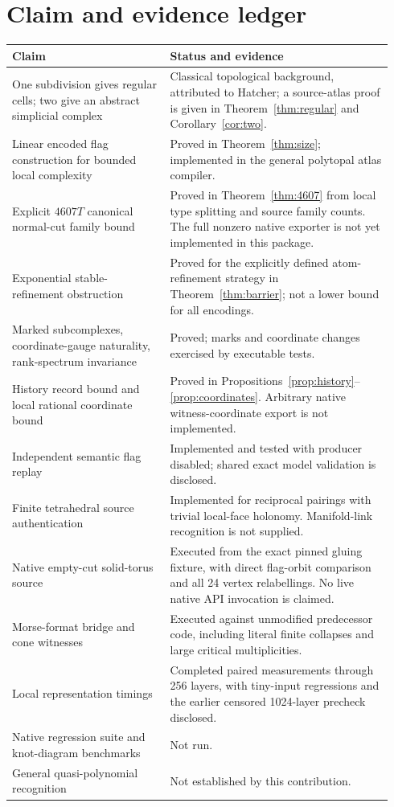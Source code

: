 \documentclass[11pt]{article}
\theoremstyle{definition}\newtheorem{definition}[theorem]{Definition}
\theoremstyle{remark}\newtheorem{remark}[theorem]{Remark}
\begin{document}
\section{Claim and evidence ledger}
\footnotesize
\begin{longtable}{p{0.39\linewidth}p{0.55\linewidth}}\toprule
Claim & Status and evidence\\\midrule\endhead
One subdivision gives regular cells; two give an abstract simplicial complex & Classical topological background, attributed to Hatcher; a source-atlas proof is given in Theorem~\ref{thm:regular} and Corollary~\ref{cor:two}.\\
Linear encoded flag construction for bounded local complexity & Proved in Theorem~\ref{thm:size}; implemented in the general polytopal atlas compiler.\\
Explicit \(4607T\) canonical normal-cut family bound & Proved in Theorem~\ref{thm:4607} from local type splitting and source family counts. The full nonzero native exporter is not yet implemented in this package.\\
Exponential stable-refinement obstruction & Proved for the explicitly defined atom-refinement strategy in Theorem~\ref{thm:barrier}; not a lower bound for all encodings.\\
Marked subcomplexes, coordinate-gauge naturality, rank-spectrum invariance & Proved; marks and coordinate changes exercised by executable tests.\\
History record bound and local rational coordinate bound & Proved in Propositions~\ref{prop:history}--\ref{prop:coordinates}. Arbitrary native witness-coordinate export is not implemented.\\
Independent semantic flag replay & Implemented and tested with producer disabled; shared exact model validation is disclosed.\\
Finite tetrahedral source authentication & Implemented for reciprocal pairings with trivial local-face holonomy. Manifold-link recognition is not supplied.\\
Native empty-cut solid-torus source & Executed from the exact pinned gluing fixture, with direct flag-orbit comparison and all 24 vertex relabellings. No live native API invocation is claimed.\\
Morse-format bridge and cone witnesses & Executed against unmodified predecessor code, including literal finite collapses and large critical multiplicities.\\
Local representation timings & Completed paired measurements through 256 layers, with tiny-input regressions and the earlier censored 1024-layer precheck disclosed.\\
Native regression suite and knot-diagram benchmarks & Not run.\\
General quasi-polynomial recognition & Not established by this contribution.\\
\bottomrule
\end{longtable}
\normalsize
\end{document}

